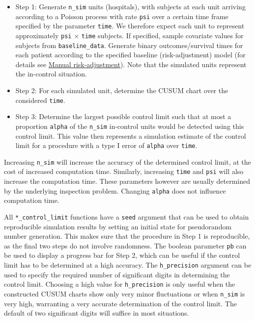 \begin{itemize}
\tightlist
\item
  Step 1: Generate \texttt{n\_sim} units (hospitals), with subjects at each unit arriving according to a Poisson process with rate \texttt{psi} over a certain time frame specified by the parameter \texttt{time}. We therefore expect each unit to represent approximately \texttt{psi} \(\times\) \texttt{time} subjects. If specified, sample covariate values for subjects from \texttt{baseline\_data}. Generate binary outcomes/survival times for each patient according to the specified baseline (risk-adjustment) model (for details see \protect\hyperlink{sec:ManualRiskAdjustment}{Manual risk-adjustment}). Note that the simulated units represent the in-control situation.
\item
  Step 2: For each simulated unit, determine the CUSUM chart over the considered \texttt{time}.
\item
  Step 3: Determine the largest possible control limit such that at most a proportion \texttt{alpha} of the \texttt{n\_sim} in-control units would be detected using this control limit. This value then represents a simulation estimate of the control limit for a procedure with a type I error of \texttt{alpha} over \texttt{time}.
\end{itemize}

Increasing \texttt{n\_sim} will increase the accuracy of the determined control limit, at the cost of increased computation time. Similarly, increasing \texttt{time} and \texttt{psi} will also increase the computation time. These parameters however are usually determined by the underlying inspection problem. Changing \texttt{alpha} does not influence computation time.

All \texttt{*\_control\_limit} functions have a \texttt{seed} argument that can be used to obtain reproducible simulation results by setting an initial state for pseudorandom number generation. This makes sure that the procedure in Step 1 is reproducible, as the final two steps do not involve randomness. The boolean parameter \texttt{pb} can be used to display a progress bar for Step 2, which can be useful if the control limit has to be determined at a high accuracy. The \texttt{h\_precision} argument can be used to specify the required number of significant digits in determining the control limit. Choosing a high value for \texttt{h\_precision} is only useful when the constructed CUSUM charts show only very minor fluctuations or when \texttt{n\_sim} is very high, warranting a very accurate determination of the control limit. The default of two significant digits will suffice in most situations.

